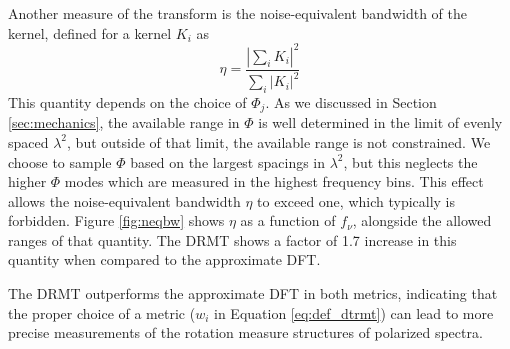 Another measure of the transform is the noise-equivalent bandwidth of the kernel, defined for a
kernel $K_i$ as
\begin{equation}
  \eta = \frac{\left|\sum_i K_i\right|^2 }{\sum_i \left|K_i\right|^2}
  \label{eq:neqbw}
\end{equation}
This quantity depends on the choice of $\Phi_j$. As we discussed in Section \ref{sec:mechanics}, the
available range in $\Phi$ is well determined in the limit of evenly spaced $\lambda^2$, but outside of 
that limit, the available range is not constrained. We choose to sample $\Phi$ based on the largest
spacings in $\lambda^2$, but this neglects the higher $\Phi$ modes which are measured in the highest
frequency bins. This effect allows the noise-equivalent bandwidth $\eta$ to exceed one, which
typically is forbidden. Figure \ref{fig:neqbw} shows $\eta$ as a function of $f_\nu$, alongside the
allowed ranges of that quantity. The DRMT shows a factor of 1.7 increase in this quantity when compared to the 
approximate DFT.

The DRMT outperforms the approximate DFT in both metrics, indicating that the proper choice of a
metric ($w_i$ in Equation \ref{eq:def_dtrmt}) can lead to more precise measurements of the rotation
measure structures of polarized spectra.
